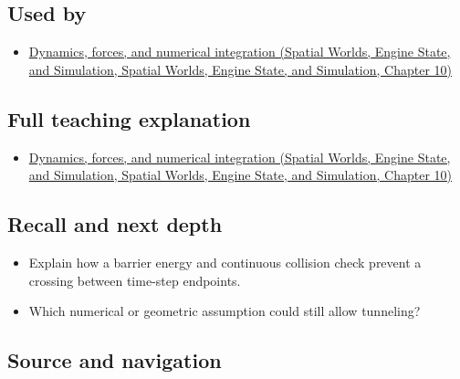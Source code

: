 \subsection{Used by}\label{appendix-a9ba01fa72a6-used-by}

\begin{itemize}
\tightlist
\item
  \href{../05-Spatial-Worlds-Engine-State-and-Simulation/main.pdf\#nameddest=04-visual-computing-ii-ch029-dynamics-forces-and-numerical-integration}{Dynamics, forces, and numerical integration (Spatial Worlds, Engine State, and Simulation, Spatial Worlds, Engine State, and Simulation, Chapter 10)}
\end{itemize}

\subsection{Full teaching explanation}\label{appendix-a9ba01fa72a6-full-teaching-explanation}

\begin{itemize}
\tightlist
\item
  \href{../05-Spatial-Worlds-Engine-State-and-Simulation/main.pdf\#nameddest=04-visual-computing-ii-ch029-dynamics-forces-and-numerical-integration}{Dynamics, forces, and numerical integration (Spatial Worlds, Engine State, and Simulation, Spatial Worlds, Engine State, and Simulation, Chapter 10)}
\end{itemize}

\subsection{Recall and next depth}\label{appendix-a9ba01fa72a6-recall-and-next-depth}

\begin{itemize}
\tightlist
\item
  Explain how a barrier energy and continuous collision check prevent a crossing between time-step endpoints.
\item
  Which numerical or geometric assumption could still allow tunneling?
\end{itemize}

\subsection{Source and navigation}\label{appendix-a9ba01fa72a6-source-and-navigation}

